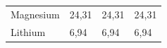{\begin{center}
\begin{xtabular*}{\mytablewidth}[t]{|p{10\mystarwidth}|p{10\mystarwidth}|p{10\mystarwidth}|p{10\mystarwidth}|}
    
        Magnesium &
    
    
        24,31 &
    
    
        24,31 &
    
    
        24,31%
     \tabularnewline{}
    
    
        Lithium &
    
    
        6,94 &
    
    
        6,94 &
    
    
        6,94%
     \tabularnewline{}
    

\end{xtabular*}
\end{center}}
